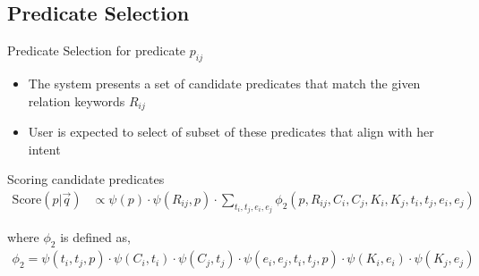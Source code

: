 \documentclass[pdf,11pt]{beamer}
\begin{document}
\begin{frame}
\end{frame}

\subsection{Predicate Selection}

\begin{frame}{Predicate Selection for predicate $p_{ij}$}

\begin{itemize}
\item<1-> The system presents a set of candidate predicates that match the given relation keywords $R_{ij}$
\item<2-> User is expected to select of subset of these predicates that align with her intent
\end{itemize}

\vspace{11pt}


\vspace{11pt}


\end{frame}



\begin{frame}{Scoring candidate predicates}
\begin{align}
\text{Score}(p|\vec{q})& \propto \psi(p) \cdot \psi(R_{ij},p) \cdot \sum_{t_i,t_j,e_i,e_j} \phi_2(p, R_{ij}, C_i, C_j, K_i, K_j, t_i, t_j, e_i, e_j) \nonumber
\end{align}

where $\phi_2$ is defined as,
\begin{align}
\phi_2 =  \psi(t_i,t_j,p) \cdot \psi(C_i,t_i) \cdot \psi(C_j,t_j) \cdot \psi(e_i,e_j,t_i,t_j,p) \cdot \psi(K_i,e_i) \cdot \psi(K_j,e_j) \label{eq:phi2}
\nonumber
\end{align}

\end{frame}
\end{document}
